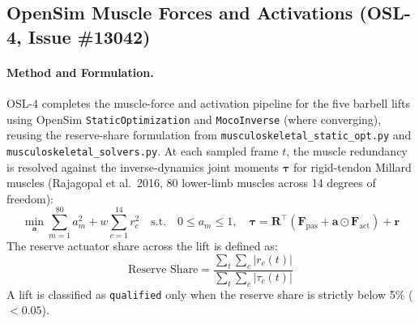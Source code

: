 \documentclass[11pt,a4paper]{article}
\begin{document}
\subsection{OpenSim Muscle Forces and Activations (OSL-4, Issue \#13042)}\label{sec:opensim-muscles}
\paragraph{Method and Formulation.}
OSL-4 completes the muscle-force and activation pipeline for the five barbell
lifts using OpenSim \texttt{StaticOptimization} and \texttt{MocoInverse} (where
converging), reusing the reserve-share formulation from
\texttt{musculoskeletal\_static\_opt.py} and \texttt{musculoskeletal\_solvers.py}.
At each sampled frame $t$, the muscle redundancy is resolved against the inverse-dynamics
joint moments $\boldsymbol{\tau}$ for rigid-tendon Millard muscles
(Rajagopal et al.\ 2016, 80 lower-limb muscles across 14 degrees of freedom):
\begin{equation}
\min_{\mathbf{a}} \sum_{m=1}^{80} a_m^2 + w \sum_{c=1}^{14} r_c^2 \quad \text{s.t.} \quad 0 \le a_m \le 1,\quad \boldsymbol{\tau} = \mathbf{R}^\top (\mathbf{F}_\text{pas} + \mathbf{a} \odot \mathbf{F}_\text{act}) + \mathbf{r}
\end{equation}
The reserve actuator share across the lift is defined as:
\begin{equation}
\text{Reserve Share} = \frac{\sum_t \sum_c |r_c(t)|}{\sum_t \sum_c |\tau_c(t)|}
\end{equation}
A lift is classified as \texttt{qualified} only when the reserve share is strictly below 5\% ($< 0.05$).
\end{document}
